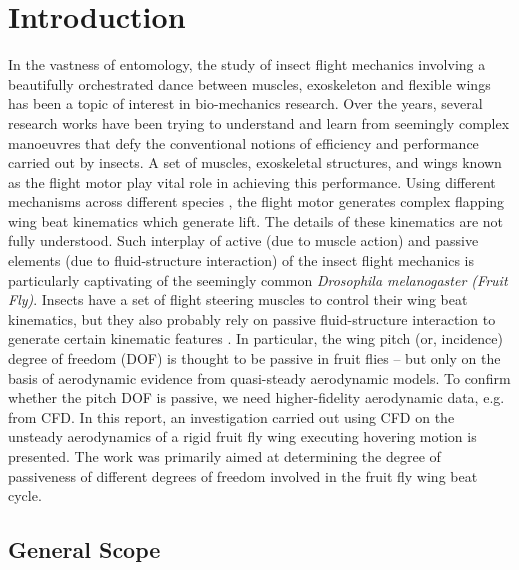 \chapter{Introduction}

In the vastness of entomology, the study of insect flight mechanics involving a beautifully orchestrated dance between muscles, exoskeleton and flexible wings has been a topic of interest in bio-mechanics research. Over the years, several research works have been trying to understand and learn from seemingly complex manoeuvres that defy the conventional notions of efficiency and performance carried out by insects\cite{Farisenkov2022,range}. A set of muscles, exoskeletal structures, and wings known as the flight motor\cite{Pons_2023} play vital role in achieving this performance. Using different mechanisms across different species \cite{PRINGLE1968163}, the flight motor generates complex flapping wing beat kinematics \cite{kinematics1,kinematics2} which generate lift. The details of these kinematics are not fully understood\cite{Pons_2023}. Such interplay of active (due to muscle action) and passive elements (due to fluid-structure interaction) of the insect flight mechanics is particularly captivating of the seemingly common \textit{Drosophila melanogaster (\textit{Fruit Fly})}\cite{Pons_2023}. Insects have a set of flight steering muscles to control their wing beat kinematics\cite{Balint}, but they also probably rely on passive fluid-structure interaction to generate certain kinematic features \cite{PhysRevE.92.022712}. In particular, the wing pitch (or, incidence) degree of freedom (DOF) is thought to be passive in fruit flies \cite{PhysRevE.92.022712} – but only on the basis of aerodynamic evidence from quasi-steady aerodynamic models. To confirm whether the pitch DOF is passive, we need higher-fidelity aerodynamic data, e.g. from CFD. In this report, an investigation carried out using CFD on the unsteady aerodynamics of a rigid fruit fly wing executing hovering motion is presented. The work was primarily aimed at determining the degree of passiveness of different degrees of freedom involved in the fruit fly wing beat cycle.

\section{General Scope}

